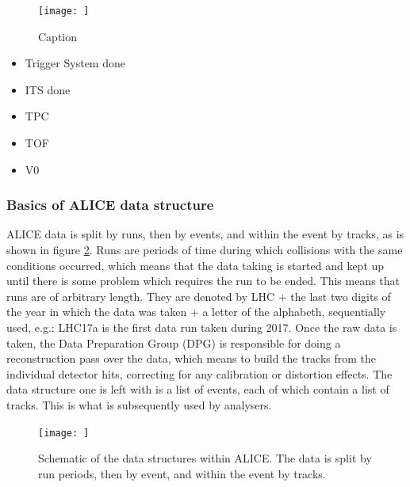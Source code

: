\begin{figure}
    \centering
    \texttt{[image: ]}
    \caption{Caption}
    \label{fig:TPC_schemtic}
\end{figure}



\begin{itemize}
    \item Trigger System done
    \item ITS done
    \item TPC %
    \item TOF
	\item V0
\end{itemize}


\subsubsection{Basics of ALICE data structure}
ALICE data is split by runs, then by events, and within the event by tracks, as is shown in figure \ref{fig:ALICE_data_schematic}. Runs are periods of time during which collisions with the same conditions occurred, which means that the data taking is started and kept up until there is some problem which requires the run to be ended. This means that runs are of arbitrary length. They are denoted by LHC + the last two digits of the year in which the data was taken + a letter of the alphabeth, sequentially used, e.g.: LHC17a is the first data run taken during 2017. Once the raw data is taken, the Data Preparation Group (DPG) is responsible for doing a reconstruction pass over the data, which means to build the tracks from the individual detector hits, correcting for any calibration or distortion effects. The data structure  one is left with is a list of events, each of which contain a list of tracks. This is what is subsequently used by analysers. 

\begin{figure}
	\texttt{[image: ]}
	\centering
	\caption{Schematic of the data structures within ALICE. The data is split by run periods, then by event, and within the event by tracks. }
		\label{fig:ALICE_data_schematic}
\end{figure}
